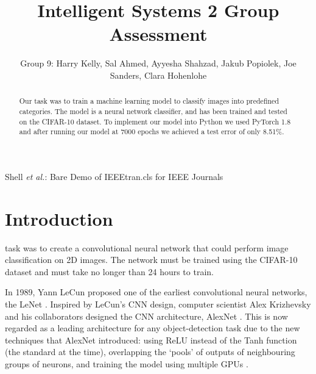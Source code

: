 \documentclass[journal]{IEEEtran}
\begin{document}
\title{Intelligent Systems 2 Group Assessment }

\author{Group 9: Harry Kelly, Sal Ahmed, Ayyesha Shahzad, Jakub Popiolek, Joe Sanders, Clara Hohenlohe}

{Shell \MakeLowercase{\textit{et al.}}: Bare Demo of IEEEtran.cls for IEEE Journals}

\maketitle

\begin{abstract}
Our task was to train a machine learning model to classify images into predefined categories. The model is a neural network classifier, and has been trained and tested on the CIFAR-10 dataset. To implement our model into Python we used PyTorch 1.8 and after running our model at 7000 epochs we achieved a test error of only 8.51\%.
\end{abstract}

\IEEEpeerreviewmaketitle

\section{Introduction}

 task was to create a convolutional neural network that could perform image classification on 2D images. The network must be trained using the CIFAR-10 dataset and must take no longer than 24 hours to train.

In 1989, Yann LeCun proposed one of the earliest convolutional neural networks, the LeNet \cite{LeCun1989}. Inspired by LeCun’s CNN design, computer scientist Alex Krizhevsky and his collaborators designed the CNN architecture, AlexNet \cite{AlexNetArticle}. This is now regarded as a leading architecture for any object-detection task due to the new techniques that AlexNet introduced: using ReLU instead of the Tanh function (the standard at the time), overlapping the ‘pools’ of outputs of neighbouring groups of neurons, and training the model using multiple GPUs \cite{tdsAlexNet}. 
\end{document}
